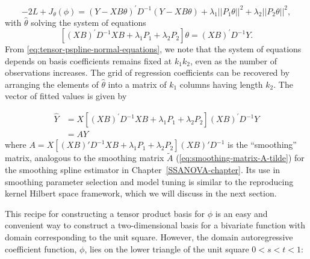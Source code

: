 \begin{equation} \label{eq:tensor-pspline-objective-function}
-2L + J_\theta\left(\phi\right) = \left( Y - XB\theta\right)^\prime D^{-1}\left( Y - XB\theta\right)  + \lambda_1\vert\vert P_1 \theta \vert\vert^2 + \lambda_2 \vert\vert P_2 \theta\vert \vert^2,
\end{equation}
\noindent
with $\hat{\theta}$ solving the system of equations 
\begin{equation} \label{eq:tensor-pspline-normal-equations}
\left[ \left(XB\right)^\prime D^{-1} XB +  \lambda_1 P_1+ \lambda_2 P_2\right]\theta = \left(X B\right)^\prime D^{-1}Y.
\end{equation}
\noindent
From \ref{eq:tensor-pspline-normal-equations}, we note that the system of equations depends on basis coefficients remains fixed at $k_1 k_2$, even as the number of observations increases. The grid of regression coefficients can be recovered by arranging the elements of $\hat{\theta}$ into a matrix of $k_1$ columns having length $k_2$. The vector of fitted values is given by 

\begin{align*}
\hat{Y} &= X \left[ \left(XB\right)^\prime D^{-1} XB +  \lambda_1 P_1+ \lambda_2 P_2\right] \left(X B\right)^\prime D^{-1}Y\\
&= AY
\end{align*}
\noindent
where $A = X \left[ \left(XB\right)' D^{-1} XB +  \lambda_1 P_1+ \lambda_2 P_2\right] \left(X B\right)' D^{-1}$ is the ``smoothing'' matrix, analogous to the smoothing matrix $\tilde{A}$ (\ref{eq:smoothing-matrix-A-tilde}) for the smoothing spline estimator in Chapter~\ref{SSANOVA-chapter}. Its use in smoothing parameter selection and model tuning is similar to the reproducing kernel Hilbert space framework, which we will discuss in the next section.

\bigskip

This recipe for constructing a tensor product basis for $\phi$ is an easy and convenient way to construct a two-dimensional basis for a bivariate function with domain corresponding to the unit square. However, the domain autoregressive coefficient function, $\phi$, lies on the lower triangle of the unit square $0 < s < t < 1$:


